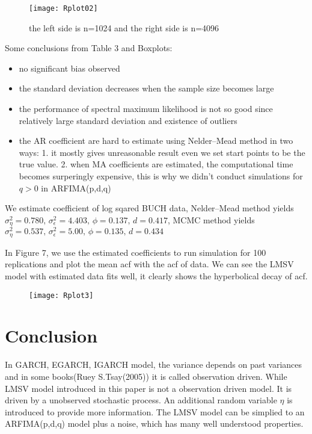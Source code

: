 \documentclass[10pt,a4paper]{article}
\begin{document}
\begin{figure}[!htb]
\centering
\texttt{[image: Rplot02]}
\caption{the left side is n=1024 and the right side is n=4096}
\end{figure}
Some conclusions from Table 3 and Boxplots:
\begin{itemize}
\item {no significant bias observed }
\item {the standard deviation decreases when the sample size becomes large}
\item {the performance of spectral maximum likelihood is not so good since relatively large standard deviation and existence of outliers }
\item {the AR coefficient are hard to estimate using Nelder–Mead method in two ways: 1. it mostly gives unreasonable result even we set start points to be the true value. 2. when MA coefficients are estimated, the computational time becomes surperingly expensive, this is why we didn't conduct simulations for $q>0$ in ARFIMA(p,d,q)}
\end{itemize}

We estimate coefficient of log sqared BUCH data, Nelder–Mead method yields $\sigma_\eta^2=0.780,\, \sigma_\epsilon^2=4.403,\,\phi= 0.137,\,d=0.417$, MCMC method yields $ \sigma_\eta^2=0.537,\, \sigma_\epsilon^2=5.00,\,\phi= 0.135,\,d=0.434 $ 

In Figure 7, we use the estimated coefficients to run simulation for 100 replications and plot the mean acf with the acf of data. We can see the LMSV model with estimated data fits well, it clearly shows the hyperbolical decay of acf.
\begin{figure}[!htb]
\centering
\texttt{[image: Rplot3]}
\caption{}
\end{figure}


\section{Conclusion}
In GARCH, EGARCH, IGARCH model, the variance depends on past variances and  in some books(Ruey S.Tsay(2005))\cite{tsay2005analysis} it is called observation driven. While LMSV model introduced in this paper is not a observation driven model. It is driven by a unobserved stochastic process. An additional random variable $\eta$ is introduced to provide more information. The LMSV model can be simplied to an ARFIMA(p,d,q) model plus a noise, which has many well understood properties.
\end{document}
